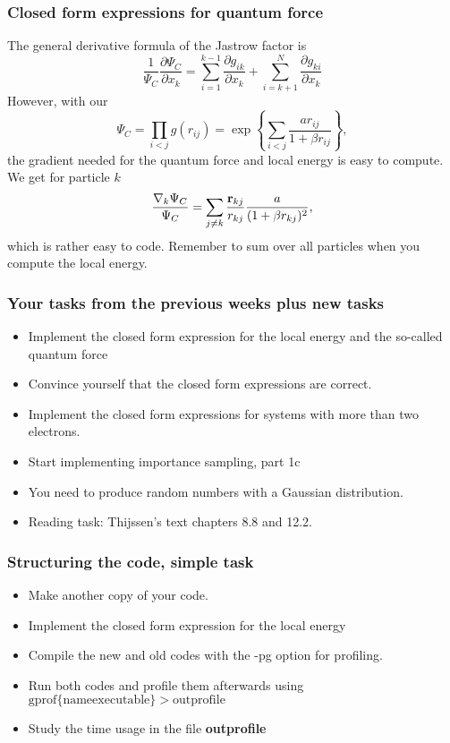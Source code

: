 \frame
{
  \frametitle{Closed form expressions for quantum force}
\begin{small}
{\scriptsize
The general derivative formula of the Jastrow factor is
\[
\frac{1}{\Psi_C}\frac{\partial \Psi_C}{\partial x_k} =
\sum_{i=1}^{k-1}\frac{\partial g_{ik}}{\partial x_k}
+
\sum_{i=k+1}^{N}\frac{\partial g_{ki}}{\partial x_k}
\]
However, 
with our
\[
\Psi_C=\prod_{i< j}g(r_{ij})= \exp{\left\{\sum_{i<j}\frac{ar_{ij}}{1+\beta r_{ij}}\right\}},
\]
the gradient needed for the quantum force and local energy is easy to compute.  
We get for particle  $k$
\[
\frac{ \nabla_k \Psi_C}{ \Psi_C }= \sum_{j\ne k}\frac{{\bf r}_{kj}}{r_{kj}}\frac{a}{(1+\beta r_{kj})^2},
\]
which is rather easy to code.  Remember to sum over all particles  when you compute the local energy.
}
\end{small}
}

\frame
{
  \frametitle{Your tasks from the previous  weeks plus new tasks}
\begin{small}
{\scriptsize
\begin{itemize}
\item Implement the closed form expression for the local energy and the so-called quantum force
\item Convince yourself that the closed form expressions are correct.
\item Implement the closed form expressions for systems with more than two electrons.
\item Start implementing importance sampling, part 1c
\item You need to produce random numbers with a Gaussian distribution.
\item Reading task: Thijssen's text chapters 8.8 and 12.2.
\end{itemize}
}
\end{small}
}

\frame
{
  \frametitle{Structuring the code, simple task}
\begin{small}
{\scriptsize
\begin{itemize}
\item Make another copy of your code.
\item Implement the closed form expression for the local energy
\item Compile the new and old codes with the -pg option for profiling.
\item Run both codes and profile them afterwards using $\mathrm{gprof} \{\mathrm{name executable}\} > \mathrm{outprofile}$
\item Study the time usage in the file {\bf outprofile}
\end{itemize}
}
\end{small}
}


